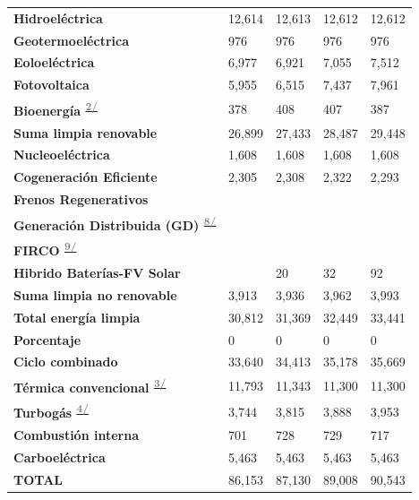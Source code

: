 \documentclass{sener2025}
\begin{document}
\begin{tabladoradoLargo}
\begin{longtable}{B{3cm}p{2.75cm}p{2.75cm}p{2.75cm}p{2.75cm}}
    \textbf{Hidroeléctrica} & 12,614 & 12,613 & 12,612 & 12,612 \\
    \textbf{Geotermoeléctrica} & 976 & 976 & 976 & 976 \\
    \textbf{Eoloeléctrica} & 6,977 & 6,921 & 7,055 & 7,512 \\
    \textbf{Fotovoltaica} & 5,955 & 6,515 & 7,437 & 7,961 \\
    \textbf{Bioenergía \textsuperscript{\hyperlink{nota2}{\textcolor{gray}{2/}}}} & 378 & 408 & 407 & 387 \\
    \textbf{Suma limpia renovable} & 26,899 & 27,433 & 28,487 & 29,448 \\
    \textbf{Nucleoeléctrica} & 1,608 & 1,608 & 1,608 & 1,608 \\
    \textbf{Cogeneración Eficiente} & 2,305 & 2,308 & 2,322 & 2,293 \\
    \textbf{Frenos Regenerativos} &  &  &  &  \\
    \textbf{Generación Distribuida (GD) \textsuperscript{\hyperlink{nota8}{\textcolor{gray}{8/}}}} &  &  &  &  \\
    \textbf{FIRCO \textsuperscript{\hyperlink{nota9}{\textcolor{gray}{9/}}}} &  &  &  &  \\
    \textbf{Hibrido Baterías-FV Solar} &  & 20 & 32 & 92 \\
    \textbf{Suma limpia no renovable} & 3,913 & 3,936 & 3,962 & 3,993 \\
    \textbf{Total energía limpia} & 30,812 & 31,369 & 32,449 & 33,441 \\
    \textbf{Porcentaje} & 0 & 0 & 0 & 0 \\
    \textbf{Ciclo combinado} & 33,640 & 34,413 & 35,178 & 35,669 \\
    \textbf{Térmica convencional \textsuperscript{\hyperlink{nota3}{\textcolor{gray}{3/}}}} & 11,793 & 11,343 & 11,300 & 11,300 \\
    \textbf{Turbogás \textsuperscript{\hyperlink{nota4}{\textcolor{gray}{4/}}}} & 3,744 & 3,815 & 3,888 & 3,953 \\
    \textbf{Combustión interna} & 701 & 728 & 729 & 717 \\
    \textbf{Carboeléctrica} & 5,463 & 5,463 & 5,463 & 5,463 \\
    \textbf{TOTAL} & 86,153 & 87,130 & 89,008 & 90,543 \\
  \end{longtable}
\end{tabladoradoLargo}
\end{document}
